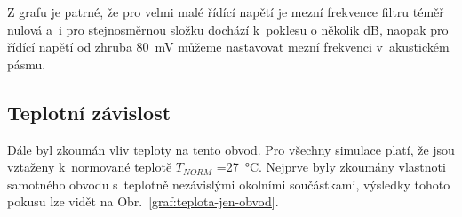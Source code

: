 \documentclass{protokol}
\begin{document}
		Z grafu je patrné, že pro velmi malé řídící napětí je mezní frekvence filtru téměř nulová a~i pro stejnosměrnou složku dochází k~poklesu o několik dB, naopak pro řídící napětí od zhruba \qty{80}{\milli\volt} můžeme nastavovat mezní frekvenci v~akustickém pásmu.
	
	\clearpage
	\subsection{Teplotní závislost}
		Dále byl zkoumán vliv teploty na tento obvod. Pro všechny simulace platí, že jsou vztaženy k~normované teplotě \(T_{NORM} \) =\qty{27}{\degreeCelsius}. Nejprve byly zkoumány vlastnoti samotného obvodu s~teplotně nezávislými okolními součástkami, výsledky tohoto pokusu lze vidět na Obr.~\ref{graf:teplota-jen-obvod}.
		
\end{document}
